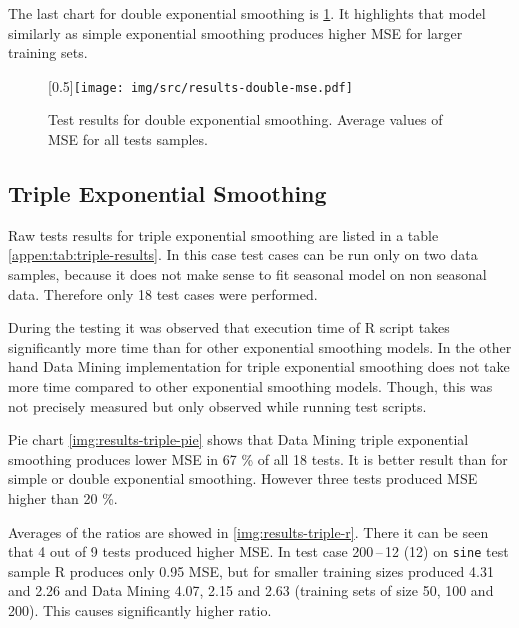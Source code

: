         The last chart for double exponential smoothing is \ref{img:results-double-mse}.
        It highlights that model similarly as simple exponential smoothing produces higher MSE for larger training sets.

        \begin{figure}[H]
            \begin{center}
                \scalebox{0.65}[0.5]{\texttt{[image: img/src/results-double-mse.pdf]}}
                \caption{Test results for double exponential smoothing. Average values of MSE for all tests samples.}
                \label{img:results-double-mse}
            \end{center}
        \end{figure}

        \subsection{Triple Exponential Smoothing} \label{sec:results-triple}
        Raw tests results for triple exponential smoothing are listed in a table \ref{appen:tab:triple-results}. In
        this case test cases can be run only on two data samples, because it does not make sense to fit seasonal
        model on non seasonal data. Therefore only 18 test cases were performed.

        During the testing it was observed that execution time of R script takes significantly more time than for other
        exponential smoothing models. In the other hand Data Mining implementation for triple exponential smoothing
        does not take more time compared to other exponential smoothing models. Though, this was not precisely measured
        but only observed while running test scripts.

        Pie chart \ref{img:results-triple-pie} shows that Data Mining triple exponential smoothing produces lower MSE
        in 67 \% of all 18 tests. It is better result than for simple or double exponential smoothing. However
        three tests produced MSE higher than 20 \%.

        Averages of the ratios are showed in \ref{img:results-triple-r}. There it can be seen that 4 out of 9 tests
        produced higher MSE. In test case 200\,--\,12 (12) on \texttt{sine} test sample R produces only 0.95 MSE, but
        for smaller training sizes produced 4.31 and 2.26 and Data Mining 4.07, 2.15 and 2.63 (training sets of size
        50, 100 and 200). This causes significantly higher ratio.

